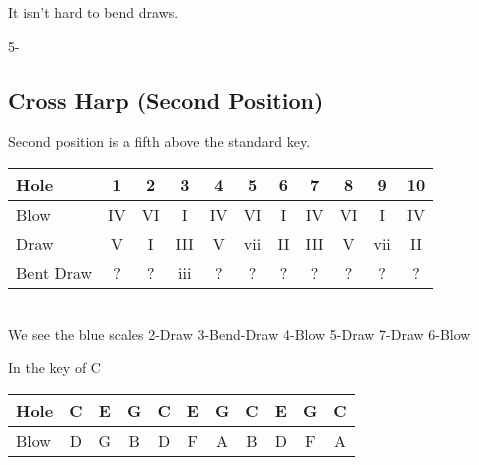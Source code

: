 \documentclass[a4paper]{scrartcl}
\begin{document}
It isn't hard to bend draws.

5-
\subsection{Cross Harp (Second Position)}
Second position is a fifth above the standard key.\\
\begin{tabular}
{| l | c | c | c | c | c | c | c | c | c | c |}
\hline 
Hole & 1 & 2 & 3 & 4 & 5 & 6 & 7 & 8 & 9 & 10 \\ \hline
Blow & IV & VI & I & IV & VI & I & IV & VI & I & IV \\ \hline
Draw & V & I & III & V & vii & II & III & V & vii & II   \\ \hline 
Bent Draw & ? & ? & iii & ? & ? & ? & ? & ? & ? & ?   \\ \hline 
\end{tabular} 
\\
We see the blue scales 2-Draw 3-Bend-Draw 4-Blow 5-Draw 7-Draw 6-Blow

In the key of C\\

\begin{tabular}
{| l | c | c | c | c | c | c | c | c | c | c |}
\hline
Hole & C & E & G & C & E & G & C & E & G & C \\ \hline
Blow & D & G & B & D & F & A & B & D & F & A \\ \hline
\end{tabular} \\
\end{document}

